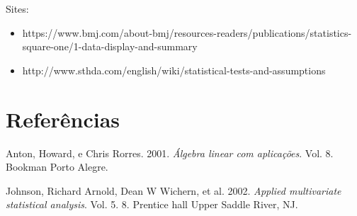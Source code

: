 \documentclass[
  letterpaper,
  DIV=11,
  numbers=noendperiod]{scrreprt}
\newlength{\cslhangindent}
\newlength{\cslentryspacingunit} %
\newenvironment{CSLReferences}[2] %
 {%
  \setlength{\parindent}{0pt}
  \ifodd #1
  \let\oldpar\par
  \def\par{\hangindent=\cslhangindent\oldpar}
  \fi
  \setlength{\parskip}{#2\cslentryspacingunit}
 }%
 {}
\begin{document}
Sites:

\begin{itemize}
\item
  https://www.bmj.com/about-bmj/resources-readers/publications/statistics-square-one/1-data-display-and-summary
\item
  http://www.sthda.com/english/wiki/statistical-tests-and-assumptions
\end{itemize}

\hypertarget{referuxeancias}{%
\chapter*{Referências}\label{referuxeancias}}


\hypertarget{refs}{}
\begin{CSLReferences}{1}{0}
\leavevmode{}%
Anton, Howard, e Chris Rorres. 2001. \emph{{Á}lgebra linear com
aplica{ç}{õ}es}. Vol. 8. Bookman Porto Alegre.

\leavevmode{}%
Johnson, Richard Arnold, Dean W Wichern, et al. 2002. \emph{Applied
multivariate statistical analysis}. Vol. 5. 8. Prentice hall Upper
Saddle River, NJ.

\end{CSLReferences}
\end{document}
